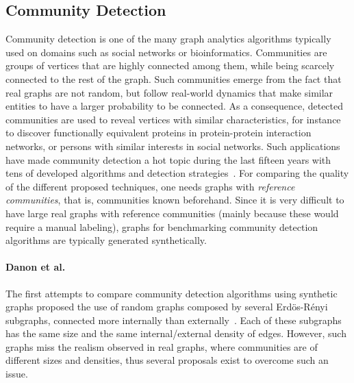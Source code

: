 \subsection{Community Detection}
\label{sec:generators_community_detection}

Community detection is one of the many graph analytics algorithms typically used
on domains such as social networks or bioinformatics. Communities are groups of
vertices that are highly connected among them, while being scarcely connected to
the rest of the graph. Such communities emerge from the fact that real graphs
are not random, but follow real-world dynamics that make similar entities to
have a larger probability to be connected. As a consequence, detected
communities are used to reveal vertices with similar characteristics, for
instance to discover functionally equivalent proteins in protein-protein
interaction networks, or persons with similar interests in social networks. Such
applications have made community detection a hot topic during the last fifteen
years with tens of developed algorithms and detection
strategies~\cite{doi:10.1002/wics.1403,Kim:2015:CDM:2854006.2854013}. For
comparing the quality of the different proposed techniques, one needs graphs
with \emph{reference communities}, that is, communities known beforehand. Since
it is very difficult to have large real graphs with reference communities
(mainly because these would require a manual labeling), graphs for benchmarking
community detection algorithms are typically generated synthetically.

\paragraph{Danon et al.} The first attempts to compare community detection algorithms using synthetic
graphs proposed the use of random graphs composed by several Erd\"{o}s-R\'{e}nyi
subgraphs, connected more internally than externally~\cite{danon2005comparing}.
Each of these subgraphs has the same size and the same internal/external density
of edges. However, such graphs miss the realism observed in real graphs, where
communities are of different sizes and densities, thus several proposals exist
to overcome such an issue. 

